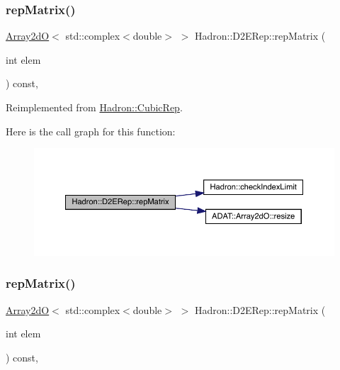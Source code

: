 \subsubsection{\texorpdfstring{repMatrix()}{repMatrix()}\hspace{0.1cm}{\footnotesize\ttfamily [1/3]}}
{\footnotesize\ttfamily \mbox{\hyperlink{classADAT_1_1Array2dO}{Array2dO}}$<$ std\+::complex$<$double$>$ $>$ Hadron\+::\+D2\+E\+Rep\+::rep\+Matrix (\begin{DoxyParamCaption}\item[{int}]{elem }\end{DoxyParamCaption}) const\hspace{0.3cm}{\ttfamily [inline]}, {\ttfamily [virtual]}}



Reimplemented from \mbox{\hyperlink{structHadron_1_1CubicRep_ac5d7e9e6f4ab1158b5fce3e4ad9e8005}{Hadron\+::\+Cubic\+Rep}}.

Here is the call graph for this function\+:
\nopagebreak
\begin{figure}[H]
\begin{center}
\leavevmode
\includegraphics[width=350pt]{d4/d82/structHadron_1_1D2ERep_a0d6937e2a9cf2e22df238b7e3eafbf8e_cgraph}
\end{center}
\end{figure}
\mbox{\label{structHadron_1_1D2ERep_a0d6937e2a9cf2e22df238b7e3eafbf8e}} 
\subsubsection{\texorpdfstring{repMatrix()}{repMatrix()}\hspace{0.1cm}{\footnotesize\ttfamily [2/3]}}
{\footnotesize\ttfamily \mbox{\hyperlink{classADAT_1_1Array2dO}{Array2dO}}$<$ std\+::complex$<$double$>$ $>$ Hadron\+::\+D2\+E\+Rep\+::rep\+Matrix (\begin{DoxyParamCaption}\item[{int}]{elem }\end{DoxyParamCaption}) const\hspace{0.3cm}{\ttfamily [inline]}, {\ttfamily [virtual]}}




